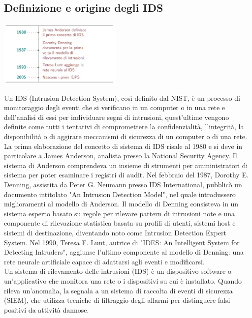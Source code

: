 \subsection{Definizione e origine degli IDS}
\begin{table}
	\includegraphics[width=0.45\textwidth]{image/IDStimeline.png}
\end{table} 
Un IDS (Intrusion Detection System), così definito dal NIST, è un processo di monitoraggio degli eventi che si verificano in un computer o in una rete e dell'analisi di essi per individuare segni di intrusioni, quest'ultime vengono definite come tutti i tentativi di compromettere la confidenzialità, l'integrità, la disponibilità o di aggirare meccanismi di sicurezza di un computer o di una rete\cite{nistIDS}.\\
La prima elaborazione del concetto di sistema di IDS risale al 1980 e si deve in particolare a James Anderson, analista presso la National Security Agency. Il sistema di Anderson comprendeva un insieme di strumenti per amministratori di sistema per poter esaminare i registri di audit\cite{ComputerSecurityThreat}. Nel febbraio del 1987, Dorothy E. Denning, assistita da Peter G. Neumann presso IDS International, pubblicò un documento intitolato "An Intrusion Detection Model", nel quale introdussero miglioramenti al modello di Anderson\cite{AnIntrusionDetectionModel}. Il modello di Denning consisteva in un sistema esperto basato su regole per rilevare pattern di intrusioni note e una componente di rilevazione statistica basata su profili di utenti, sistemi host e sistemi di destinazione, diventando noto come Intrusion Detection Expert System. Nel 1990, Teresa F. Lunt, autrice di "IDES: An Intelligent System for Detecting Intruders", aggiunse l'ultimo componente al modello di Denning: una rete neurale artificiale capace di adattarsi agli eventi e modificarsi\cite{IDES}.\\
Un sistema di rilevamento delle intrusioni (IDS) è un dispositivo software o un'applicativo che monitora una rete o i dispositivi su cui è installato. Quando rileva un'anomalia, la segnala a un sistema di raccolta di eventi di sicurezza (SIEM), che utilizza tecniche di filtraggio degli allarmi per distinguere falsi positivi da attività dannose\cite{taxonomy}.\\
